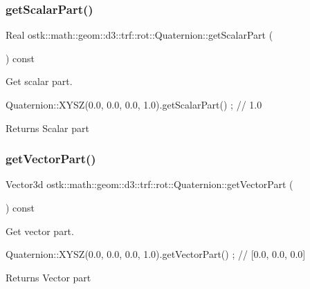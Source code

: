 \subsubsection{\texorpdfstring{get\+Scalar\+Part()}{getScalarPart()}}
{\footnotesize\ttfamily Real ostk\+::math\+::geom\+::d3\+::trf\+::rot\+::\+Quaternion\+::get\+Scalar\+Part (\begin{DoxyParamCaption}{ }\end{DoxyParamCaption}) const}



Get scalar part. 


\begin{DoxyCode}
Quaternion::XYSZ(0.0, 0.0, 0.0, 1.0).getScalarPart() ; \textcolor{comment}{// 1.0}
\end{DoxyCode}


\begin{DoxyReturn}{Returns}
Scalar part 
\end{DoxyReturn}
\mbox{\label{classostk_1_1math_1_1geom_1_1d3_1_1trf_1_1rot_1_1_quaternion_a88ec3b0a13fe2f708eb1955a97866a36}} 
\subsubsection{\texorpdfstring{get\+Vector\+Part()}{getVectorPart()}}
{\footnotesize\ttfamily Vector3d ostk\+::math\+::geom\+::d3\+::trf\+::rot\+::\+Quaternion\+::get\+Vector\+Part (\begin{DoxyParamCaption}{ }\end{DoxyParamCaption}) const}



Get vector part. 


\begin{DoxyCode}
Quaternion::XYSZ(0.0, 0.0, 0.0, 1.0).getVectorPart() ; \textcolor{comment}{// [0.0, 0.0, 0.0]}
\end{DoxyCode}


\begin{DoxyReturn}{Returns}
Vector part 
\end{DoxyReturn}
\mbox{\label{classostk_1_1math_1_1geom_1_1d3_1_1trf_1_1rot_1_1_quaternion_a75b09159acd3346e3ad848b0162181f4}} 
